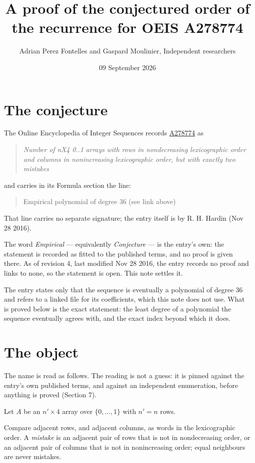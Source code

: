 \documentclass[11pt]{article}
\title{A proof of the conjectured order of the recurrence for OEIS A278774}
\author{Adrian Perez Fontelles and Gaspard Moulinier, Independent researchers}
\date{09 September 2026}
\theoremstyle{definition}
\begin{document}
\maketitle
\section{The conjecture}

The Online Encyclopedia of Integer Sequences records \href{https://oeis.org/A278774}{A278774} as

\begin{quote}\itshape Number of nX4 0..1 arrays with rows in nondecreasing lexicographic order and columns in nonincreasing lexicographic order, but with exactly two mistakes\end{quote}

and carries in its Formula section the line:

\begin{quote}\ttfamily Empirical polynomial of degree 36 (see link above)\end{quote}

That line carries no separate signature; the entry itself is by R. H. Hardin (Nov 28 2016).

The word {\itshape Empirical} --- equivalently {\itshape Conjecture} --- is the entry's own: the statement is recorded as fitted to the published terms, and no proof is given there. As of revision 4, last modified Nov 28 2016, the entry records no proof and links to none, so the statement is open. This note settles it.

The entry states only that the sequence is eventually a polynomial of degree $36$ and refers to a linked file for its coefficients, which this note does not use. What is proved below is the exact statement: the least degree of a polynomial the sequence eventually agrees with, and the exact index beyond which it does.

\section{The object}

The name is read as follows. The reading is not a guess: it is pinned against the entry's own published terms, and against an independent enumeration, before anything is proved (Section 7).

Let $A$ be an $n' \times 4$ array over $\{0,\dots,1\}$ with $n' = n$ rows.

Compare adjacent rows, and adjacent columns, as words in the lexicographic order. A {\itshape mistake} is an adjacent pair of rows that is not in nondecreasing order, or an adjacent pair of columns that is not in nonincreasing order; equal neighbours are never mistakes.
\end{document}
